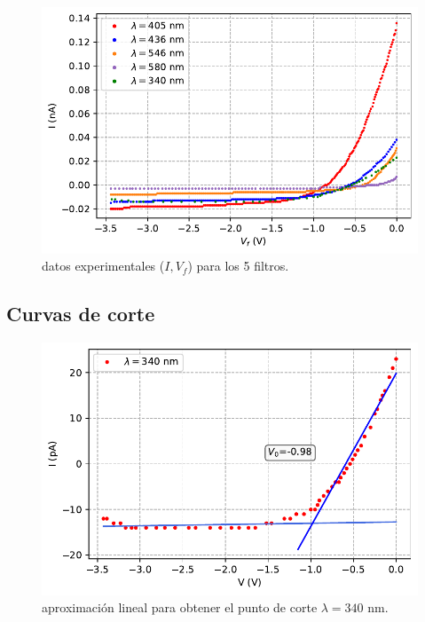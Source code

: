 \documentclass[12pt,a4paper]{article}
\numberwithin{equation}{section}
\numberwithin{table}{section}
\numberwithin{figure}{section}
\begin{document}
\begin{figure}[h!] \centering
\includegraphics[scale=1.1]{datos.pdf}
\caption{datos experimentales ($I,V_f$) para los 5 filtros.}
\label{Fig:6.0.1}

\end{figure}


\newpage
\subsection{Curvas de corte} \label{Subsec:6.1}

\begin{figure}[h!]  \centering
\includegraphics[scale=0.97]{Datos_cortes_1.pdf}
\caption{aproximación lineal para obtener el punto de corte $\lambda=340$ nm.}
\label{Fig:6.1.1}
\end{figure}
\end{document}

